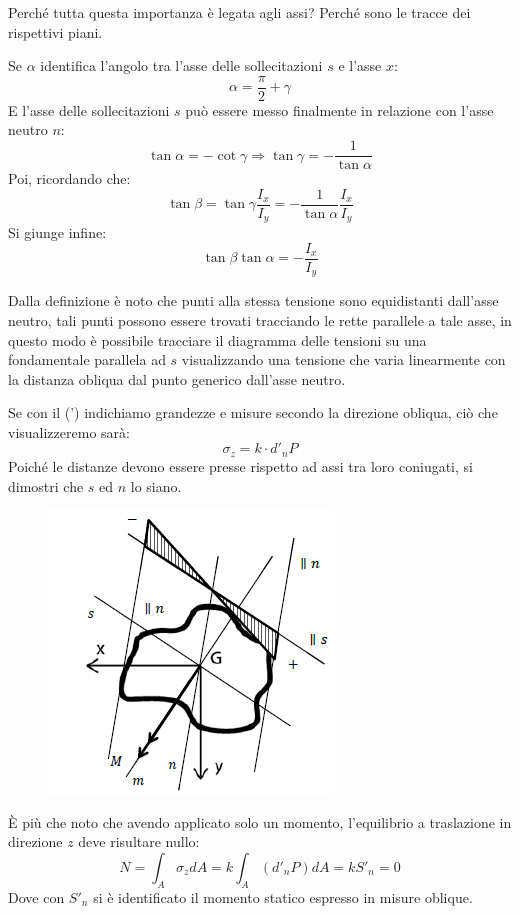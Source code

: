 		
		Perché tutta questa importanza è legata agli assi? Perché sono le tracce dei rispettivi piani. \newline 
		
		Se $\alpha$ identifica l'angolo tra l'asse delle sollecitazioni $s$ e l'asse $x$:
		\[ \alpha = \dfrac{\pi}{2} + \gamma\]
		E l'asse delle sollecitazioni $s$ può essere messo finalmente in relazione con l'asse neutro $n$: 
		\[ \tan\alpha = -\cot\gamma \Rightarrow \tan\gamma = - \dfrac{1}{\tan\alpha}\]
		Poi, ricordando che: 
		\[ \tan\beta = \tan\gamma \dfrac{I_x}{I_y} = - \dfrac{1}{\tan\alpha} \dfrac{I_x}{I_y}\]
		Si giunge infine:
		\[ \tan\beta\tan\alpha = -\dfrac{I_x}{I_y} \]
		
		Dalla definizione è noto che punti alla stessa tensione sono equidistanti dall'asse neutro, tali punti possono essere trovati tracciando le rette parallele a tale asse, in questo modo è possibile tracciare il diagramma delle tensioni su una fondamentale parallela ad $s$ visualizzando una tensione che varia linearmente con la distanza obliqua dal punto generico dall'asse neutro. 
		
		Se con il (') indichiamo grandezze e misure secondo la direzione obliqua, ciò che visualizzeremo sarà: 
		\[ \sigma_z = k \cdot d'_nP\]
		Poiché le distanze devono essere presse rispetto ad assi tra loro coniugati, si dimostri che $s$ ed $n$ lo siano.

\begin{figure}[H]
	\centering
	\includegraphics[width=0.5\linewidth]{immagini_4/screenshot003}
	\label{fig:screenshot003}
\end{figure}		
		
		È più che noto che avendo applicato solo un momento, l'equilibrio a traslazione in direzione $z$ deve risultare nullo:
		\[ N = \int_A\sigma_zdA = k\int_A(d'_nP)dA= kS'_n = 0\]
		Dove con $S'_n$ si è identificato il momento statico espresso in misure oblique. 
		
